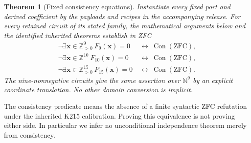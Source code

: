 \documentclass[11pt]{article}
\newtheorem{theorem}{Theorem}[section]
\newcommand{\N}{\mathbb N}\newcommand{\Z}{\mathbb Z}
\newcommand{\Pos}{\mathbb Z_{>0}}\newcommand{\Con}{\operatorname{Con}}
\begin{document}
\begin{theorem}[Fixed consistency equations]
Instantiate every fixed port and derived coefficient by the payloads and
recipes in the accompanying release. For every retained circuit of its
stated family, the mathematical arguments below and the identified inherited
theorems establish in ZFC
\[
\begin{aligned}
 \neg\exists\mathbf x\in\Pos^9\ F_9(\mathbf x)=0
   &\ \longleftrightarrow\ \Con(\mathrm{ZFC}),\\
 \neg\exists\mathbf x\in\Z^{10}\ F_{10}(\mathbf x)=0
   &\ \longleftrightarrow\ \Con(\mathrm{ZFC}),\\
 \neg\exists\mathbf x\in\Pos^{15}\ P_{15}(\mathbf x)=0
   &\ \longleftrightarrow\ \Con(\mathrm{ZFC}).
\end{aligned}
\]
The nine-nonnegative circuits give the same assertion over $\N^9$ by an
explicit coordinate translation. No other domain conversion is implicit.
\end{theorem}
The consistency predicate means the absence of a finite syntactic ZFC
refutation under the inherited K215 calibration. Proving this equivalence
is not proving either side. In particular we infer no unconditional
independence theorem merely from consistency.


\end{document}
